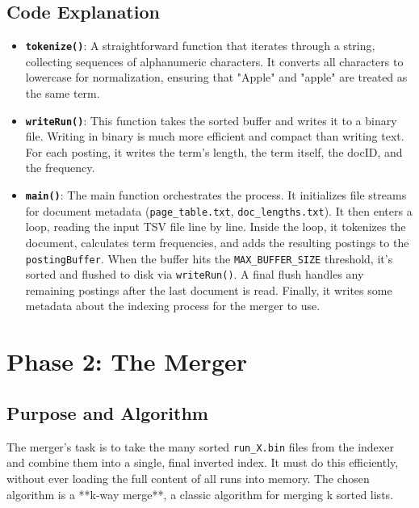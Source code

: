 \documentclass[11pt, a4paper]{report}
\begin{document}
\section{Code Explanation}
\begin{itemize}
    \item \textbf{\texttt{tokenize()}}: A straightforward function that iterates through a string, collecting sequences of alphanumeric characters. It converts all characters to lowercase for normalization, ensuring that "Apple" and "apple" are treated as the same term.
    
    \item \textbf{\texttt{writeRun()}}: This function takes the sorted buffer and writes it to a binary file. Writing in binary is much more efficient and compact than writing text. For each posting, it writes the term's length, the term itself, the docID, and the frequency.
    
    \item \textbf{\texttt{main()}}: The main function orchestrates the process. It initializes file streams for document metadata (\lstinline{page_table.txt}, \lstinline{doc_lengths.txt}). It then enters a loop, reading the input TSV file line by line. Inside the loop, it tokenizes the document, calculates term frequencies, and adds the resulting postings to the \lstinline{postingBuffer}. When the buffer hits the \lstinline{MAX_BUFFER_SIZE} threshold, it's sorted and flushed to disk via \lstinline{writeRun()}. A final flush handles any remaining postings after the last document is read. Finally, it writes some metadata about the indexing process for the merger to use.
\end{itemize}

\newpage
\chapter{Phase 2: The Merger}

\section{Purpose and Algorithm}
The merger's task is to take the many sorted \lstinline{run_X.bin} files from the indexer and combine them into a single, final inverted index. It must do this efficiently, without ever loading the full content of all runs into memory. The chosen algorithm is a **k-way merge**, a classic algorithm for merging k sorted lists.
\end{document}
